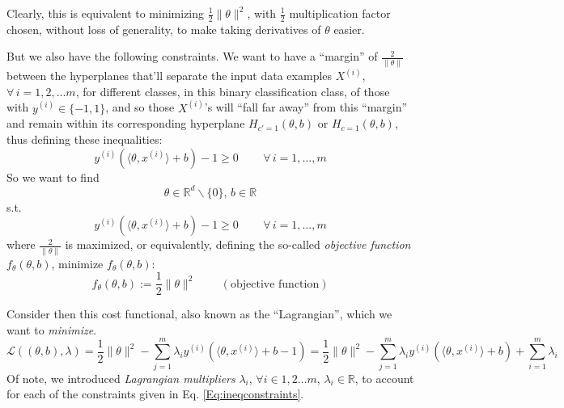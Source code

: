 \documentclass[10pt]{amsart}
\begin{document}
\begin{multicols*}{2}
Clearly, this is equivalent to minimizing $\frac{1}{2} \| \theta \|^2$, with $\frac{1}{2}$ multiplication factor chosen, without loss of generality, to make taking derivatives of $\theta$ easier.

But we also have the following constraints.  We want to have a ``margin'' of $\frac{2}{\|\theta\|}$ between the hyperplanes that'll separate the input data examples $X^{(i)}$, $\forall \, i =1,2,\dots m$, for different classes, in this binary classification class, of those with $y^{(i)} \in \lbrace -1, 1\rbrace$, and so those $X^{(i)}$'s will ``fall far away'' from this ``margin'' and remain within its corresponding hyperplane $H_{c'=1}(\theta,b)$ or $H_{c=1}(\theta,b)$, thus defining these inequalities:
\begin{equation}\label{Eq:ineqconstraints}
  y^{(i)}(\langle \theta,x^{(i)} \rangle + b) - 1 \geq 0 \qquad\, \forall \, i = 1, \dots, m 
\end{equation}
So we want to find 
\[
\theta \in \mathbb{R}^d \backslash \lbrace 0 \rbrace ,\, b\in \mathbb{R}
\]
s.t.
\[
y^{(i)}(\langle \theta,x^{(i)} \rangle + b) - 1 \geq 0 \qquad\, \forall \, i = 1, \dots, m
\]
where $\frac{2}{\| \theta \|}$ is maximized, or equivalently, defining the so-called \emph{objective function} $f_{\theta}(\theta,b)$, minimize $f_{\theta}(\theta,b)$:
\begin{equation}
f_{\theta}(\theta,b) := \frac{1}{2} \| \theta \|^2 \qquad \, (\text{objective function})
\end{equation}

Consider then this cost functional, also known as the ``Lagrangian'', which we want to \emph{minimize}.  
\begin{equation}\label{Eq:costLagrangianL}
  \mathcal{L}((\theta,b),\lambda) = \frac{1}{2} \| \theta\|^2 - \sum_{j=1}^m \lambda_i y^{(i)}(\langle \theta, x^{(i)} \rangle + b - 1)   =  \frac{1}{2} \| \theta\|^2 - \sum_{j=1}^m \lambda_i y^{(i)}(\langle \theta, x^{(i)} \rangle + b) +\sum_{i=1}^m \lambda_i 
  \end{equation}
Of note, we introduced \emph{Lagrangian multipliers} $\lambda_i$, $\forall i \in 1,2\dots m$, $\lambda_i \in \mathbb{R}$, to account for each of the constraints given in Eq. \ref{Eq:ineqconstraints}.  


\end{multicols*}
\end{document}
